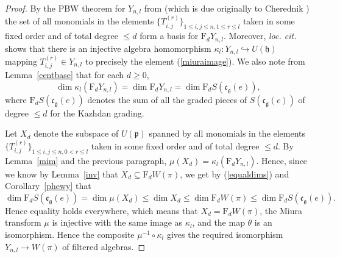 \documentclass[twoside,12pt,reqno]{amsart}
\def\F{\mathrm{F}}
\begin{document}
\begin{proof}
By the PBW theorem for $Y_{n,l}$ from \cite[Theorem 3.1]{BK}
(which is due originally to Cherednik \cite{Ch0,Ch})
the set of all monomials in the elements
$\{T_{i,j}^{(r)}\}_{1 \leq i,j \leq n, 1 \leq r \leq l}$
taken in some fixed order and of total degree $\leq d$
form a basis for $\F_d Y_{n,l}$.
Moreover, {\em loc. cit.} shows that
there is an injective
algebra homomorphism
$\kappa_l:Y_{n,l} \hookrightarrow U(\mathfrak{h})$
mapping $T_{i,j}^{(r)} \in Y_{n,l}$ to precisely the
element (\ref{miuraimage}).
We also note from Lemma~\ref{centbase} that for each $d \geq 0$,
\begin{equation}\label{equaldims}
\dim \kappa_l(\F_d Y_{n,l}) =
\dim \F_d Y_{n,l}
= \dim \F_d S(\mathfrak{c}_{\mathfrak{g}}(e)),
\end{equation}
where $\F_d S(\mathfrak{c}_{\mathfrak{g}}(e))$
denotes the sum of all the graded pieces of 
$S(\mathfrak{c}_{\mathfrak{g}}(e))$ of degree $\leq d$
for the Kazhdan grading.

Let $X_d$ denote the subspace of $U(\mathfrak{p})$
spanned by all monomials in the elements
$\{T_{i,j}^{(r)}\}_{1 \leq i,j \leq n, 0 < r \leq l}$
taken in some fixed order and of total degree $\leq d$.
By Lemma~\ref{mim} and the previous paragraph, 
$\mu(X_d) = \kappa_l (\F_d Y_{n,l})$.
Hence, since we know by Lemma~\ref{inv} that $X_d \subseteq \F_d W(\pi)$, 
we get by 
(\ref{equaldims}) and
Corollary~\ref{phewy} that
$$
\dim \F_d S(\mathfrak{c}_{\mathfrak{g}}(e))
= \dim \mu(X_d) \leq \dim X_d \leq \dim \F_d W(\pi)
\leq \dim \F_d S(\mathfrak{c}_{\mathfrak{g}}(e)).
$$
Hence equality holds everywhere, which means
that $X_d = \F_d W(\pi)$, the Miura transform $\mu$ is injective
with the same image as $\kappa_l$, and the map $\theta$ is 
an isomorphism. Hence the composite $\mu^{-1} \circ \kappa_l$
gives the required isomorphism $Y_{n,l} \rightarrow W(\pi)$
of filtered algebras.
\end{proof}
\end{document}
